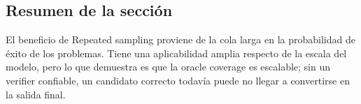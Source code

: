 
\subsection{Resumen de la sección}

El beneficio de Repeated sampling proviene de la cola larga en la probabilidad de éxito de los problemas. Tiene una aplicabilidad amplia respecto de la escala del modelo, pero lo que demuestra es que la oracle coverage es escalable; sin un verifier confiable, un candidato correcto todavía puede no llegar a convertirse en la salida final.

